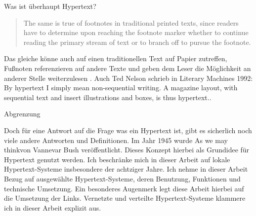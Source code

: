 \begin{section}{Was ist überhaupt Hypertext?}
\begin{quote}
    \glqq The same is true of footnotes in traditional printed texts, since readers have to determine upon reaching the footnote marker whether to continue reading the primary stream of text or to branch off to pursue the footnote. \grqq{ }\cite{Nielsen1995}
\end{quote}

Das gleiche könne auch auf einen traditionellen Text auf Papier zutreffen, Fußnoten referenzieren auf andere Texte und geben dem Leser die Möglichkeit an anderer Stelle weiterzulesen \cite{Nielsen1995}. Auch Ted Nelson schrieb in Literary Machines 1992: \glqq By hypertext I simply mean non-sequential writing. A magazine layout, with sequential text and insert illustrations and boxes, is thus hypertext.\grqq{ }\cite{Nelson1992}.

\end{section}

\begin{section}{Abgrenzung}
\label{sec:abgrenzung}

Doch für eine Antwort auf die Frage was ein Hypertext ist, gibt es sicherlich noch viele andere Antworten und Definitionen. Im Jahr 1945 wurde \glqq As we may think\grqq{ }von Vannevar Bush veröffentlicht. Dieses Konzept hierbei als Grundidee für Hypertext genutzt werden. Ich beschränke mich in dieser Arbeit auf lokale Hypertext-Systeme insbesondere der achtziger Jahre. Ich nehme in dieser Arbeit Bezug auf ausgewählte Hypertext-Systeme, deren Benutzung, Funktionen und technische Umsetzung. Ein besonderes Augenmerk legt diese Arbeit hierbei auf die Umsetzung der Links. Vernetzte und verteilte Hypertext-Systeme klammere ich in dieser Arbeit explizit aus.

\end{section}